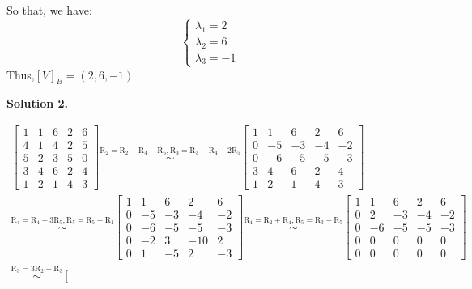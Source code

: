 \documentclass[12pt]{article}
\newcommand{\solution}[1]{\noindent \textbf{Solution #1.}}
\begin{document}
  So that, we have:
  $$
  \left\{\begin{array}{l}
  \lambda_1=2 \\
  \lambda_2=6 \\
  \lambda_3=-1
  \end{array}\right.
  $$
  Thus,$[V]_B = (2,6,-1)$

\solution{2}

  \[
  \begin{array}{c}
  \left[\begin{array}{ccccc}
  1 & 1 & 6 & 2 & 6 \\
  4 & 1 & 4 & 2 & 5 \\
  5 & 2 & 3 & 5 & 0 \\
  3 & 4 & 6 & 2 & 4 \\
  1 & 2 & 1 & 4 & 3 
  \end{array}\right]
  \overset{\text{R}_2 = \text{R}_2 - \text{R}_4 - \text{R}_5,\text{R}_3 = \text{R}_3 - \text{R}_4 - 2\text{R}_5}{\sim}
  \left[\begin{array}{ccccc}
  1 & 1 & 6 & 2 & 6 \\
  0 & -5 & -3 & -4 & -2 \\
  0 & -6 & -5 & -5 & -3 \\
  3 & 4 & 6 & 2 & 4 \\
  1 & 2 & 1 & 4 & 3 
  \end{array}\right] \\
  \overset{\text{R}_4 = \text{R}_4 - 3\text{R}_5, \text{R}_5 = \text{R}_5 - \text{R}_1 }{\sim}
  \left[\begin{array}{ccccc}
  1 & 1 & 6 & 2 & 6 \\
  0 & -5 & -3 & -4 & -2 \\
  0 & -6 & -5 & -5 & -3 \\
  0 & -2 & 3 & -10 & 2 \\
  0 & 1 & -5 & 2 & -3 
  \end{array}\right]
  \overset{\text{R}_4 = \text{R}_2 + \text{R}_4, \text{R}_5 = \text{R}_3 - \text{R}_5 }{\sim}
  \left[\begin{array}{ccccc}
  1 & 1 & 6 & 2 & 6 \\
  0 & 2 & -3 & -4 & -2 \\
  0 & -6 & -5 & -5 & -3 \\
  0 & 0 & 0 & 0 & 0 \\
  0 & 0 & 0 & 0 & 0 
  \end{array}\right]
  \\ \overset{\text{R}_3 = 3\text{R}_2 + \text{R}_3}{\sim}
  \left[\begin{array}{ccccc}

\end{array}
\end{array}\]
\end{document}
